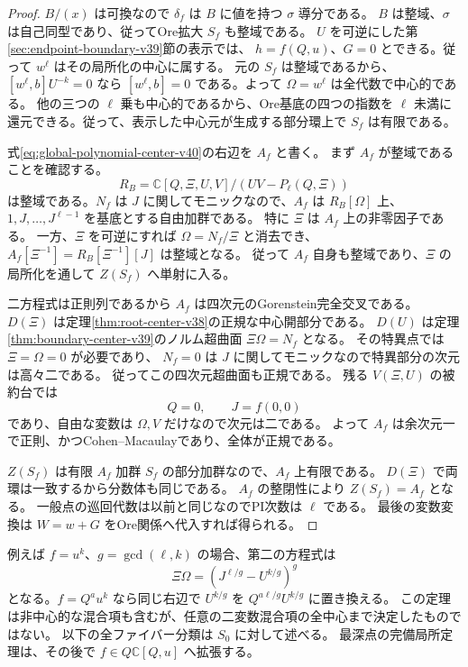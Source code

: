 \begin{proof}
$B/(x)$ は可換なので $\delta_f$ は $B$ に値を持つ $\sigma$ 導分である。
$B$ は整域、$\sigma$ は自己同型であり、従ってOre拡大 $S_f$ も整域である。
$U$ を可逆にした第\ref{sec:endpoint-boundary-v39}節の表示では、
$h=f(Q,u)$、$G=0$ とできる。従って $w^\ell$ はその局所化の中心に属する。
元の $S_f$ は整域であるから、$[w^\ell,b]U^{-k}=0$ なら
$[w^\ell,b]=0$ である。よって $\Omega=w^\ell$ は全代数で中心的である。
他の三つの $\ell$ 乗も中心的であるから、Ore基底の四つの指数を
$\ell$ 未満に還元できる。従って、表示した中心元が生成する部分環上で $S_f$ は有限である。

式\eqref{eq:global-polynomial-center-v40}の右辺を $A_f$ と書く。
まず $A_f$ が整域であることを確認する。
\[
 R_B=\mathbb C[Q,\Xi,U,V]/(UV-P_\ell(Q,\Xi))
\]
は整域である。$N_f$ は $J$ に関してモニックなので、$A_f$ は
$R_B[\Omega]$ 上、$1,J,\ldots,J^{\ell-1}$ を基底とする自由加群である。
特に $\Xi$ は $A_f$ 上の非零因子である。
一方、$\Xi$ を可逆にすれば $\Omega=N_f/\Xi$ と消去でき、
$A_f[\Xi^{-1}]=R_B[\Xi^{-1}][J]$ は整域となる。
従って $A_f$ 自身も整域であり、$\Xi$ の局所化を通して $Z(S_f)$ へ単射に入る。

二方程式は正則列であるから $A_f$ は四次元のGorenstein完全交叉である。
$D(\Xi)$ は定理\ref{thm:root-center-v38}の正規な中心開部分である。
$D(U)$ は定理\ref{thm:boundary-center-v39}のノルム超曲面
$\Xi\Omega=N_f$ となる。
その特異点では $\Xi=\Omega=0$ が必要であり、
$N_f=0$ は $J$ に関してモニックなので特異部分の次元は高々二である。
従ってこの四次元超曲面も正規である。
残る $V(\Xi,U)$ の被約台では
\[
 Q=0,\qquad J=f(0,0)
\]
であり、自由な変数は $\Omega,V$ だけなので次元は二である。
よって $A_f$ は余次元一で正則、かつCohen--Macaulayであり、全体が正規である。

$Z(S_f)$ は有限 $A_f$ 加群 $S_f$ の部分加群なので、$A_f$ 上有限である。
$D(\Xi)$ で両環は一致するから分数体も同じである。
$A_f$ の整閉性により $Z(S_f)=A_f$ となる。
一般点の巡回代数は以前と同じなのでPI次数は $\ell$ である。
最後の変数変換は $W=w+G$ をOre関係へ代入すれば得られる。
\end{proof}

例えば $f=u^k$、$g=\gcd(\ell,k)$ の場合、第二の方程式は
\[
 \Xi\Omega=(J^{\ell/g}-U^{k/g})^g
\]
となる。$f=Q^a u^k$ なら同じ右辺で $U^{k/g}$ を
$Q^{a\ell/g}U^{k/g}$ に置き換える。
この定理は非中心的な混合項も含むが、任意の二変数混合項の全中心まで決定したものではない。
以下の全ファイバー分類は $S_0$ に対して述べる。
最深点の完備局所定理は、その後で $f\in Q\mathbb C[Q,u]$ へ拡張する。

